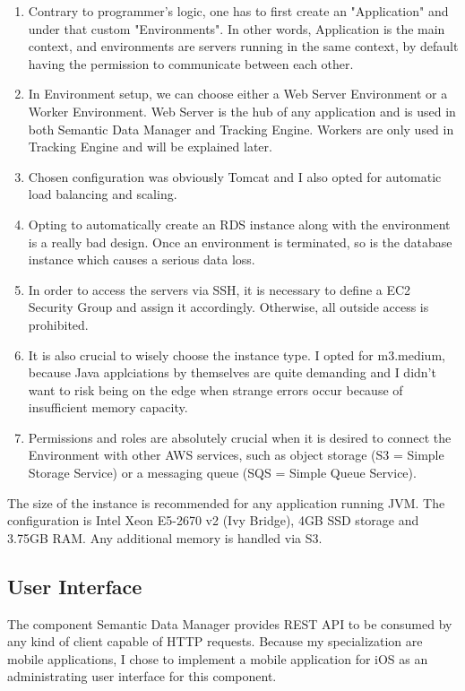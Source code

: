 \begin{enumerate}
	\item Contrary to programmer's logic, one has to first create an "Application" and under that custom "Environments". In other words, Application is the main context, and environments are servers running in the same context, by default having the permission to communicate between each other.
	\item In Environment setup, we can choose either a Web Server Environment or a Worker Environment. Web Server is the hub of any application and is used in both Semantic Data Manager and Tracking Engine. Workers are only used in Tracking Engine and will be explained later.
	\item Chosen configuration was obviously Tomcat and I also opted for automatic load balancing and scaling.
	\item Opting to automatically create an RDS instance along with the environment is a really bad design. Once an environment is terminated, so is the database instance which causes a serious data loss.
	\item In order to access the servers via SSH, it is necessary to define a EC2 Security Group and assign it accordingly. Otherwise, all outside access is prohibited.
	\item It is also crucial to wisely choose the instance type. I opted for m3.medium, because Java applciations by themselves are quite demanding and I didn't want to risk being on the edge when strange errors occur because of insufficient memory capacity.
	\item Permissions and roles are absolutely crucial when it is desired to connect the Environment with other AWS services, such as object storage (S3 = Simple Storage Service) or a messaging queue (SQS = Simple Queue Service).
\end{enumerate}

 The size of the instance is recommended for any application running JVM. The configuration is Intel Xeon E5-2670 v2 (Ivy Bridge), 4GB SSD storage and 3.75GB RAM. Any additional memory is handled via S3.

\subsection{User Interface}

The component Semantic Data Manager provides REST API to be consumed by any kind of client capable of HTTP requests. Because my specialization are mobile applications, I chose to implement a mobile application for iOS as an administrating user interface for this component.

